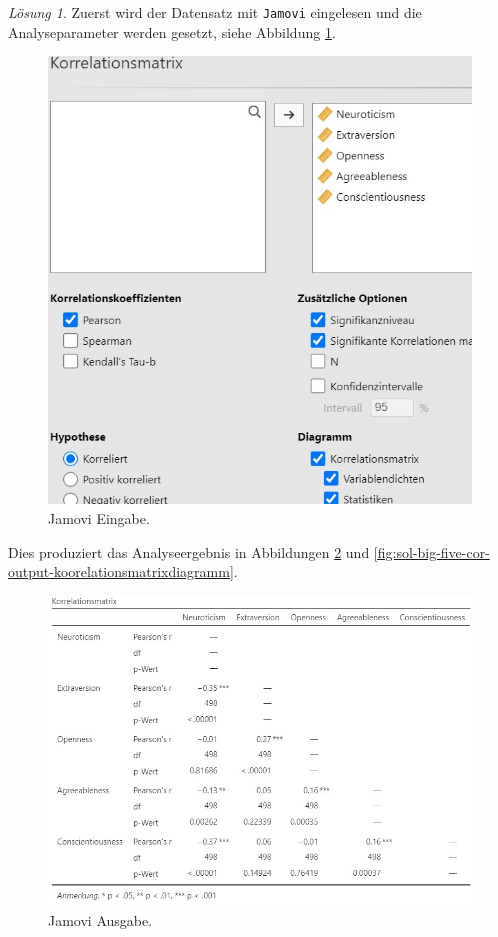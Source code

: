 \documentclass[
]{book}
\theoremstyle{definition}
\theoremstyle{definition}
\theoremstyle{definition}
\theoremstyle{definition}
\theoremstyle{remark}
\newtheorem*{solution}{Lösung}
\begin{document}
\begin{solution}

Zuerst wird der Datensatz mit \texttt{Jamovi} eingelesen und die Analyseparameter werden gesetzt, siehe Abbildung \ref{fig:sol-big-five-cor-input}.

\begin{figure}
\includegraphics[width=1\linewidth]{figures/08-exr-big-five-cor-jmv-input} \caption{Jamovi Eingabe.}\label{fig:sol-big-five-cor-input}
\end{figure}

Dies produziert das Analyseergebnis in Abbildungen \ref{fig:sol-big-five-cor-output-koorelationsmatrix} und \ref{fig:sol-big-five-cor-output-koorelationsmatrixdiagramm}.

\begin{figure}
\includegraphics[width=1\linewidth]{figures/08-exr-big-five-cor-jmv-output-korrelationsmatrix} \caption{Jamovi Ausgabe.}\label{fig:sol-big-five-cor-output-koorelationsmatrix}
\end{figure}


\end{solution}
\end{document}
